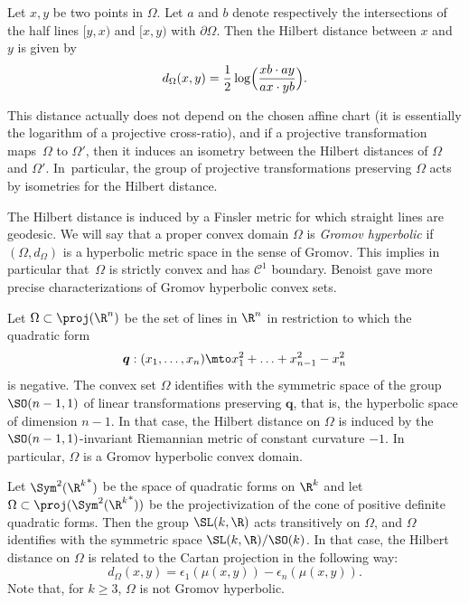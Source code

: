\begin{defi}
Let $x,y$ be two points in $\Omega$. Let $a$ and $b$ denote respectively the intersections of the half lines $[y,x)$ and $[x,y)$ with $\partial \Omega$. Then the Hilbert distance between $x$ and $y$ is given by
\[d_\Omega(x,y) = \frac{1}{2}\log\Bigl(\frac{xb\cdot ay}{ax \cdot yb}\Bigr).\]
\end{defi}

This distance actually does not depend on the chosen affine chart (it is essentially the logarithm of a projective cross-ratio), and if a projective transformation maps~$\Omega$ to $\Omega'$, then it induces an isometry between the Hilbert distances of $\Omega$ and $\Omega'$. In~particular, the group of projective transformations preserving $\Omega$ acts by isometries for the Hilbert distance.

The Hilbert distance is induced by a Finsler metric for which straight lines are geodesic. We will say that a proper convex domain $\Omega$ is \emph{Gromov hyperbolic} if $(\Omega,d_\Omega)$ is a hyperbolic metric space in the sense of Gromov. This implies in particular that~$\Omega$ is strictly convex and has $\mathcal C^1$ boundary. Benoist \cite{Benoist2001convexe} gave more precise characterizations of Gromov hyperbolic convex sets.

\begin{example} \label{ex:Ellipsoid}
Let $\Omega \subset \proj(\R^n)$ be the set of lines in $\R^n$ in restriction to which the quadratic form
\[\boldsymbol{q} :(x_1,\ldots,x_n) \mto x_1^2+ \ldots + x_{n-1}^2 - x_n^2\]
is negative. The convex set $\Omega$ identifies with the symmetric space of the group \hbox{$\SO(n-1,1)$} of linear transformations preserving $\boldsymbol{q}$, that is, the hyperbolic space of dimension $n-1$. In that case, the Hilbert distance on $\Omega$ is induced by the $\SO(n-1,1)$-invariant Riemannian metric of constant curvature $-1$. In particular, $\Omega$ is a Gromov hyperbolic convex domain.
\end{example}

\begin{example} \label{ex:ConvexSymmetricSpace}
Let $\Sym^2({\R^k}^*)$ be the space of quadratic forms on $\R^k$ and let $\Omega \subset \proj(\Sym^2({\R^k}^*))$ be the projectivization of the cone of positive definite quadratic forms. Then the group $\SL(k,\R)$ acts transitively on $\Omega$, and $\Omega$ identifies with the symmetric space $\SL(k,\R)/\SO(k)$. In that case, the Hilbert distance on $\Omega$ is related to the Cartan projection in the following way:
\[d_\Omega(x,y) = \epsilon_1(\mu(x,y)) - \epsilon_n(\mu(x,y)).\]
Note that, for $k\geq 3$, $\Omega$ is not Gromov hyperbolic.
\end{example}

